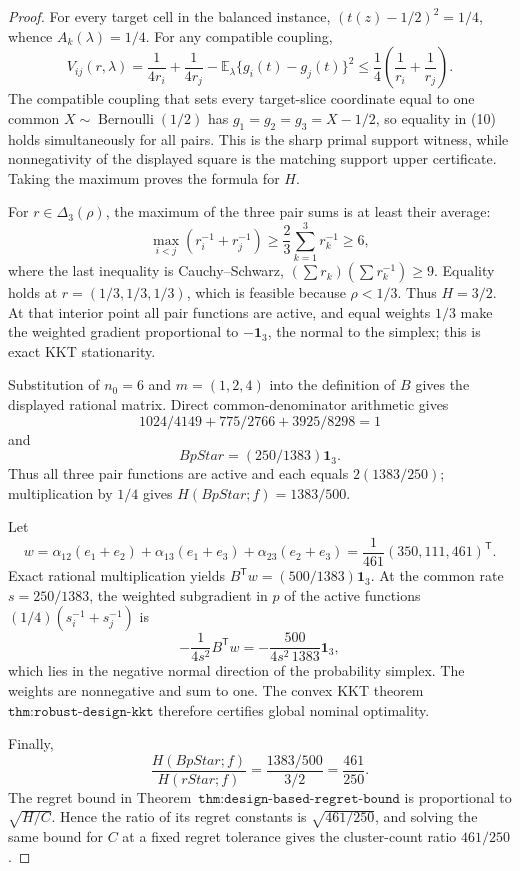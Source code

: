 \documentclass{article}
\begin{document}
\begin{proof}
For every target cell in the balanced instance, \((t(z)-1/2)^2=1/4\), whence \(A_k(\lambda)=1/4\). For any compatible coupling,
\[
V_{ij}(r,\lambda)=\frac1{4r_i}+\frac1{4r_j}-\mathbb E_\lambda\{g_i(t)-g_j(t)\}^2
\le\frac14\left(\frac1{r_i}+\frac1{r_j}\right).
\tag{10}
\]
The compatible coupling that sets every target-slice coordinate equal to one common \(X\sim\operatorname{Bernoulli}(1/2)\) has \(g_1=g_2=g_3=X-1/2\), so equality in (10) holds simultaneously for all pairs. This is the sharp primal support witness, while nonnegativity of the displayed square is the matching support upper certificate. Taking the maximum proves the formula for \(H\).

For \(r\in\Delta_3(\rho)\), the maximum of the three pair sums is at least their average:
\[
\max_{i<j}(r_i^{-1}+r_j^{-1})\ge\frac23\sum_{k=1}^3r_k^{-1}\ge6,
\]
where the last inequality is Cauchy--Schwarz, \((\sum r_k)(\sum r_k^{-1})\ge9\). Equality holds at \(r=(1/3,1/3,1/3)\), which is feasible because \(\rho<1/3\). Thus \(H=3/2\). At that interior point all pair functions are active, and equal weights \(1/3\) make the weighted gradient proportional to \(-\mathbf1_3\), the normal to the simplex; this is exact KKT stationarity.

Substitution of \(n_0=6\) and \(m=(1,2,4)\) into the definition of \(B\) gives the displayed rational matrix. Direct common-denominator arithmetic gives
\[
1024/4149+775/2766+3925/8298=1
\]
and
\[
BpStar=(250/1383)\mathbf1_3.
\]
Thus all three pair functions are active and each equals \(2(1383/250)\); multiplication by \(1/4\) gives \(H(BpStar;f)=1383/500\).

Let
\[
w=\alpha_{12}(e_1+e_2)+\alpha_{13}(e_1+e_3)+\alpha_{23}(e_2+e_3)
=\frac1{461}(350,111,461)^{\mathsf T}.
\]
Exact rational multiplication yields \(B^{\mathsf T}w=(500/1383)\mathbf1_3\). At the common rate \(s=250/1383\), the weighted subgradient in \(p\) of the active functions \((1/4)(s_i^{-1}+s_j^{-1})\) is
\[
-\frac1{4s^2}B^{\mathsf T}w=-\frac{500}{4s^2\,1383}\mathbf1_3,
\]
which lies in the negative normal direction of the probability simplex. The weights are nonnegative and sum to one. The convex KKT theorem \(\texttt{thm:robust-design-kkt}\) therefore certifies global nominal optimality.

Finally,
\[
\frac{H(BpStar;f)}{H(rStar;f)}=\frac{1383/500}{3/2}=\frac{461}{250}.
\]
The regret bound in Theorem~\(\texttt{thm:design-based-regret-bound}\) is proportional to \(\sqrt{H/C}\). Hence the ratio of its regret constants is \(\sqrt{461/250}\), and solving the same bound for \(C\) at a fixed regret tolerance gives the cluster-count ratio \(461/250\).
\end{proof}
\end{document}
